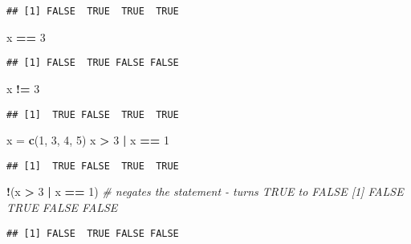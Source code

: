 \documentclass[]{article}
\newenvironment{Shaded}{\begin{snugshade}}{\end{snugshade}}
\newcommand{\CommentTok}[1]{\textcolor[rgb]{0.56,0.35,0.01}{\textit{#1}}}
\newcommand{\DecValTok}[1]{\textcolor[rgb]{0.00,0.00,0.81}{#1}}
\newcommand{\KeywordTok}[1]{\textcolor[rgb]{0.13,0.29,0.53}{\textbf{#1}}}
\newcommand{\NormalTok}[1]{#1}
\newcommand{\OperatorTok}[1]{\textcolor[rgb]{0.81,0.36,0.00}{\textbf{#1}}}
\newcommand{\StringTok}[1]{\textcolor[rgb]{0.31,0.60,0.02}{#1}}
\begin{document}
\begin{verbatim}
## [1] FALSE  TRUE  TRUE  TRUE
\end{verbatim}

\begin{Shaded}
\begin{Highlighting}[]
\NormalTok{x }\OperatorTok{==}\StringTok{ }\DecValTok{3}
\end{Highlighting}
\end{Shaded}

\begin{verbatim}
## [1] FALSE  TRUE FALSE FALSE
\end{verbatim}

\begin{Shaded}
\begin{Highlighting}[]
\NormalTok{x }\OperatorTok{!=}\StringTok{ }\DecValTok{3}
\end{Highlighting}
\end{Shaded}

\begin{verbatim}
## [1]  TRUE FALSE  TRUE  TRUE
\end{verbatim}

\begin{Shaded}
\begin{Highlighting}[]
\NormalTok{x =}\StringTok{ }\KeywordTok{c}\NormalTok{(}\DecValTok{1}\NormalTok{, }\DecValTok{3}\NormalTok{, }\DecValTok{4}\NormalTok{, }\DecValTok{5}\NormalTok{) }
\NormalTok{x }\OperatorTok{>}\StringTok{ }\DecValTok{3} \OperatorTok{|}\StringTok{ }\NormalTok{x }\OperatorTok{==}\StringTok{ }\DecValTok{1} 
\end{Highlighting}
\end{Shaded}

\begin{verbatim}
## [1]  TRUE FALSE  TRUE  TRUE
\end{verbatim}

\begin{Shaded}
\begin{Highlighting}[]
\OperatorTok{!}\NormalTok{(x }\OperatorTok{>}\StringTok{ }\DecValTok{3} \OperatorTok{|}\StringTok{ }\NormalTok{x }\OperatorTok{==}\StringTok{ }\DecValTok{1}\NormalTok{) }\CommentTok{# negates the statement - turns TRUE to FALSE [1] FALSE TRUE FALSE FALSE }
\end{Highlighting}
\end{Shaded}

\begin{verbatim}
## [1] FALSE  TRUE FALSE FALSE
\end{verbatim}
\end{document}
